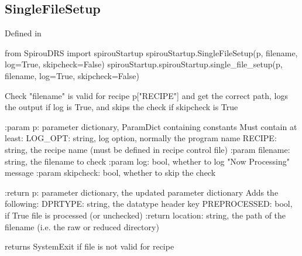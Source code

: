 \noindent\begin{minipage}{\textwidth}
\subsection{SingleFileSetup}

Defined in \spirouStartup{}

\begin{pythonbox}
from SpirouDRS import spirouStartup
spirouStartup.SingleFileSetup(p, filename, log=True, skipcheck=False)
spirouStartup.spirouStartup.single_file_setup(p, filename, log=True, skipcheck=False)
\end{pythonbox}

\begin{pythondocstring}
Check "filename" is valid for recipe p["RECIPE"] and get the correct path,
logs the output if log is True, and skips the check if skipcheck is True

:param p: parameter dictionary, ParamDict containing constants
    Must contain at least:
        LOG_OPT: string, log option, normally the program name
        RECIPE: string, the recipe name (must be defined in recipe control
                file)
:param filename: string, the filename to check
:param log: bool, whether to log "Now Processing" message
:param skipcheck: bool, whether to skip the check

:return p: parameter dictionary, the updated parameter dictionary
        Adds the following:
            DPRTYPE: string, the datatype header key
            PREPROCESSED: bool, if True file is processed (or unchecked)
:return location: string, the path of the filename (i.e. the raw or
                  reduced directory)

returns SystemExit if file is not valid for recipe
\end{pythondocstring}
\end{minipage}



